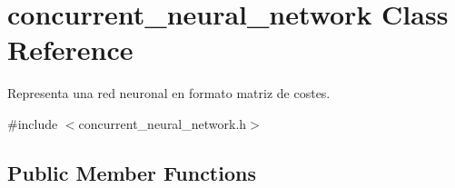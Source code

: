 \hypertarget{classconcurrent__neural__network}{}\section{concurrent\+\_\+neural\+\_\+network Class Reference}
\label{classconcurrent__neural__network}


Representa una red neuronal en formato matriz de costes.  




{\ttfamily \#include $<$concurrent\+\_\+neural\+\_\+network.\+h$>$}

\subsection*{Public Member Functions}
